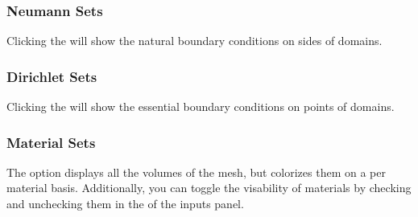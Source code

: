 \subsubsection{Neumann Sets}
Clicking the  will show the natural boundary conditions on sides of domains.

\subsubsection{Dirichlet Sets}
Clicking the  will show the essential boundary conditions on points of domains.

\subsubsection{Material Sets}
The  option displays all the volumes of the mesh, but colorizes them on a per material basis.  Additionally, you can toggle the visability of materials by checking and unchecking them in the  of the inputs panel.